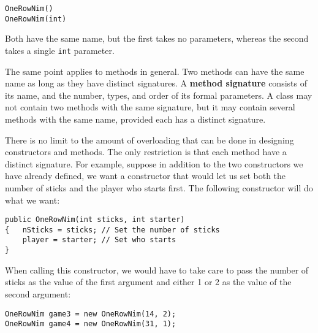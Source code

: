 \begin{jjjlisting}
\begin{lstlisting}
OneRowNim()
OneRowNim(int)
\end{lstlisting}
\end{jjjlisting}

\noindent Both have the same name, but the first takes no
parameters, whereas the second takes a single {\tt int} parameter.

The same point applies
to methods in general.  Two methods can have the same name as long as
they have distinct signatures.  A {\bf method signature} consists of
its name, and the number, types, and order of its formal parameters.
A class may not contain two methods with the same signature, but it
may contain several methods with the same name, provided each has a
distinct signature.


\noindent There is no limit to the amount of overloading
that can be done in designing constructors and methods.  The only
restriction is that each method have a distinct signature.  For
example, suppose in addition to the two constructors we have already
defined, we want a constructor that would let us set both the number
of sticks and the player who starts first.  The following constructor
will do what we want:

\begin{jjjlisting}
\begin{lstlisting}
public OneRowNim(int sticks, int starter)
{   nSticks = sticks; // Set the number of sticks
    player = starter; // Set who starts
}
\end{lstlisting}
\end{jjjlisting}

\noindent   When calling this constructor, we would have
to take care to pass the number of sticks as the value of the first
argument and either 1 or 2 as the value of the second argument:

\begin{jjjlisting}
\begin{lstlisting}
OneRowNim game3 = new OneRowNim(14, 2);
OneRowNim game4 = new OneRowNim(31, 1);
\end{lstlisting}
\end{jjjlisting}


